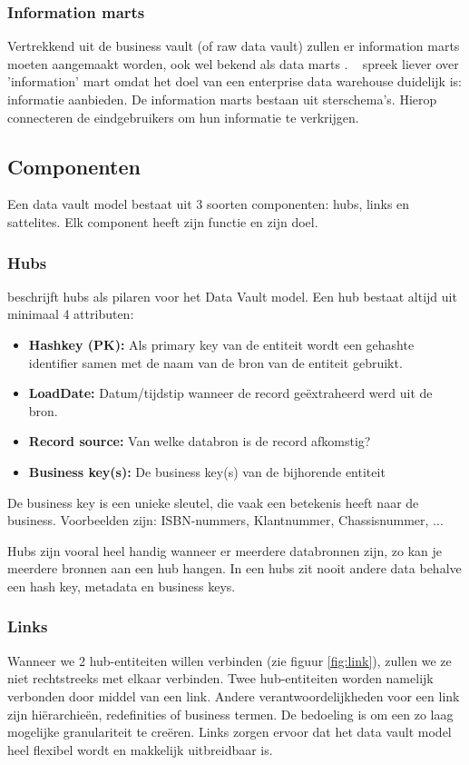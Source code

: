 \subsubsection{Information marts}
Vertrekkend uit de business vault (of raw data vault) zullen er information marts moeten aangemaakt worden, ook wel bekend als data marts . ~\textcite{Linstedt2016} spreek liever over 'information' mart omdat het doel van een enterprise data warehouse duidelijk is: informatie aanbieden. 
De information marts bestaan uit sterschema's. Hierop connecteren de eindgebruikers om hun informatie te verkrijgen. 

\subsection{Componenten}
Een data vault model bestaat uit 3 soorten componenten: hubs, links en sattelites. Elk component heeft zijn functie en zijn doel.

\subsubsection{Hubs}
\textcite{Linstedt2016} beschrijft hubs als pilaren voor het Data Vault model. Een hub bestaat altijd uit minimaal 4 attributen:

\begin{itemize}
	\item \textbf{Hashkey (PK):} Als primary key van de entiteit wordt een gehashte identifier samen met de naam van de bron van de entiteit gebruikt.
	\item \textbf{LoadDate:} Datum/tijdstip wanneer de record geëxtraheerd werd uit de bron.
	\item \textbf{Record source:} Van welke databron is de record afkomstig?
	\item \textbf{Business key(s):} De business key(s) van de bijhorende entiteit
\end{itemize} 

 De business key is een unieke sleutel, die vaak een betekenis heeft naar de business. Voorbeelden zijn: ISBN-nummers, Klantnummer, Chassisnummer, ...
 
 Hubs zijn vooral heel handig wanneer er meerdere databronnen zijn, zo kan je meerdere bronnen aan een hub hangen. In een hubs zit nooit andere data behalve een hash key, metadata en business keys.

\subsubsection{Links}
Wanneer we 2 hub-entiteiten willen verbinden (zie figuur \ref{fig:link}), zullen we ze niet rechtstreeks met elkaar verbinden. Twee hub-entiteiten worden namelijk verbonden door middel van een link. Andere verantwoordelijkheden voor een link zijn hiërarchieën, redefinities of business termen. De bedoeling is om een zo laag mogelijke granulariteit te creëren. Links zorgen ervoor dat het data vault model heel flexibel wordt en makkelijk uitbreidbaar is. 

